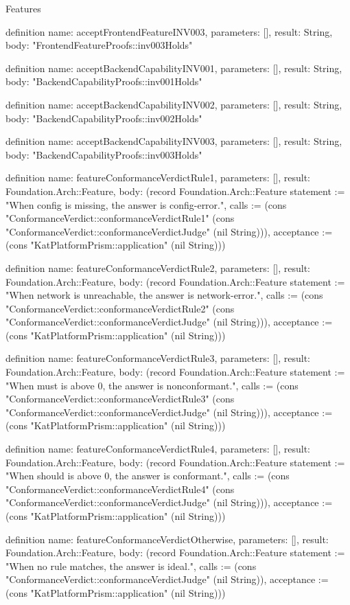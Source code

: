 \begin{lexlean}{Features}
\begin{semanticmodule}
definition{
  name: acceptFrontendFeatureINV003,
  parameters: [],
  result: String,
  body: "FrontendFeatureProofs::inv003Holds"
}

definition{
  name: acceptBackendCapabilityINV001,
  parameters: [],
  result: String,
  body: "BackendCapabilityProofs::inv001Holds"
}

definition{
  name: acceptBackendCapabilityINV002,
  parameters: [],
  result: String,
  body: "BackendCapabilityProofs::inv002Holds"
}

definition{
  name: acceptBackendCapabilityINV003,
  parameters: [],
  result: String,
  body: "BackendCapabilityProofs::inv003Holds"
}

definition{
  name: featureConformanceVerdictRule1,
  parameters: [],
  result: Foundation.Arch::Feature,
  body: (record Foundation.Arch::Feature {statement := "When config is missing, the answer is config-error.", calls := (cons "ConformanceVerdict::conformanceVerdictRule1" (cons "ConformanceVerdict::conformanceVerdictJudge" (nil String))), acceptance := (cons "KatPlatformPrism::application" (nil String))})
}

definition{
  name: featureConformanceVerdictRule2,
  parameters: [],
  result: Foundation.Arch::Feature,
  body: (record Foundation.Arch::Feature {statement := "When network is unreachable, the answer is network-error.", calls := (cons "ConformanceVerdict::conformanceVerdictRule2" (cons "ConformanceVerdict::conformanceVerdictJudge" (nil String))), acceptance := (cons "KatPlatformPrism::application" (nil String))})
}

definition{
  name: featureConformanceVerdictRule3,
  parameters: [],
  result: Foundation.Arch::Feature,
  body: (record Foundation.Arch::Feature {statement := "When must is above 0, the answer is nonconformant.", calls := (cons "ConformanceVerdict::conformanceVerdictRule3" (cons "ConformanceVerdict::conformanceVerdictJudge" (nil String))), acceptance := (cons "KatPlatformPrism::application" (nil String))})
}

definition{
  name: featureConformanceVerdictRule4,
  parameters: [],
  result: Foundation.Arch::Feature,
  body: (record Foundation.Arch::Feature {statement := "When should is above 0, the answer is conformant.", calls := (cons "ConformanceVerdict::conformanceVerdictRule4" (cons "ConformanceVerdict::conformanceVerdictJudge" (nil String))), acceptance := (cons "KatPlatformPrism::application" (nil String))})
}

definition{
  name: featureConformanceVerdictOtherwise,
  parameters: [],
  result: Foundation.Arch::Feature,
  body: (record Foundation.Arch::Feature {statement := "When no rule matches, the answer is ideal.", calls := (cons "ConformanceVerdict::conformanceVerdictJudge" (nil String)), acceptance := (cons "KatPlatformPrism::application" (nil String))})
}


\end{semanticmodule}
\end{lexlean}

